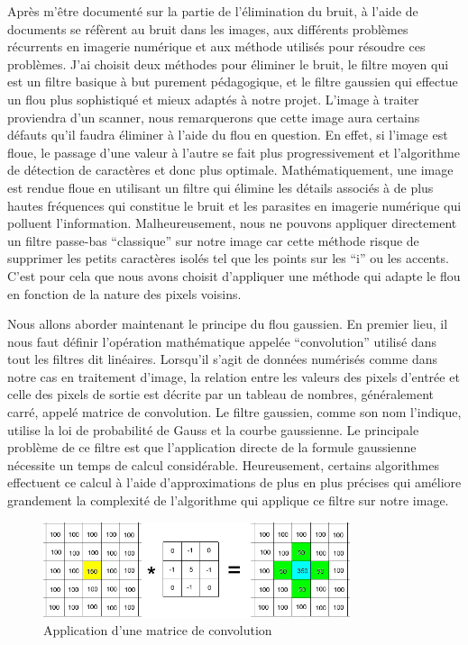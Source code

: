 \documentclass[11pt]{report}
\begin{document}
Après m'être documenté sur la partie de l'élimination du bruit, à l'aide de documents se réfèrent au bruit dans les images, aux différents problèmes récurrents en imagerie numérique et aux méthode utilisés pour résoudre ces problèmes. J'ai choisit deux méthodes pour éliminer le bruit, le filtre moyen qui est un filtre basique à but purement pédagogique, et le filtre gaussien qui effectue un flou plus sophistiqué et mieux adaptés à notre projet. L'image à traiter proviendra d'un scanner, nous remarquerons que cette image aura certains défauts qu'il faudra éliminer à l'aide du flou en question. En effet, si l'image est floue, le passage d'une valeur à l'autre se fait plus progressivement et l'algorithme de détection de caractères et donc plus optimale. Mathématiquement, une image est rendue floue en utilisant un filtre qui élimine les détails associés à de plus hautes fréquences qui constitue le bruit et les parasites en imagerie numérique qui polluent l'information. Malheureusement, nous ne pouvons appliquer directement un filtre passe-bas ``classique'' sur notre image car cette méthode risque de supprimer les petits caractères isolés tel que les points sur les ``i'' ou les accents. C'est pour cela que nous avons choisit d'appliquer une méthode qui adapte le flou en fonction de la nature des pixels voisins.

Nous allons aborder maintenant le principe du flou gaussien. En premier lieu, il nous faut définir l'opération mathématique appelée ``convolution'' utilisé dans tout les filtres dit linéaires. Lorsqu'il s'agit de données numérisés comme dans notre cas en traitement d'image, la relation entre les valeurs des pixels d'entrée et celle des pixels de sortie est décrite par un tableau de nombres, généralement carré, appelé matrice de convolution.  Le filtre gaussien, comme son nom l'indique, utilise la loi de probabilité de Gauss et la courbe gaussienne. Le principale problème de ce filtre est que l'application directe de la formule gaussienne nécessite un temps de calcul considérable. Heureusement, certains algorithmes effectuent ce calcul à l'aide d'approximations de plus en plus précises qui améliore grandement la complexité de l'algorithme qui applique ce filtre sur notre image.

\begin{figure}[htbp]
\centering
\includegraphics[width=9cm]{matconvol.jpg}
\caption{Application d'une matrice de convolution}
\end{figure}
\end{document}
